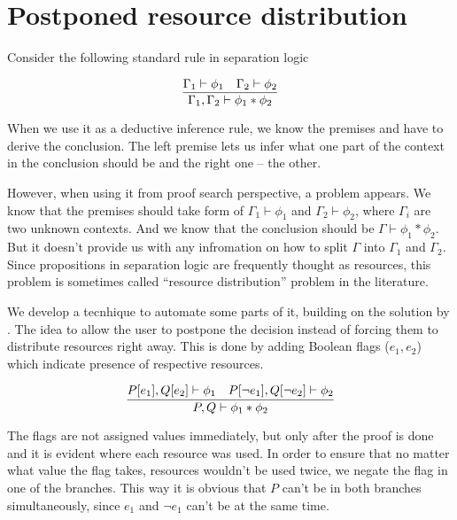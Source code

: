 \chapter{Postponed resource distribution}
\label{chap:postponed_splitting}
Consider the following standard rule in separation logic

\[\infer{\Gamma_1, \Gamma_2 \vdash \phi_1 \ast \phi_2}
        {\Gamma_1 \vdash \phi_1 &
         \Gamma_2 \vdash \phi_2} \]

When we use it as a deductive inference rule, we know the premises and have to derive the conclusion.
The left premise lets us infer what one part of the context in the conclusion should be and the right one -- the other.

However, when using it from proof search perspective, a problem appears.
We know that the premises should take form of \(\Gamma_1 \vdash \phi_1\) and \(\Gamma_2 \vdash \phi_2\), where $\Gamma_i$ are two unknown contexts.
And we know that the conclusion should be \(\Gamma \vdash \phi_1 \ast \phi_2\).
But it doesn't provide us with any infromation on how to split \(\Gamma\) into \(\Gamma_1\) and \(\Gamma_2\).
Since propositions in separation logic are frequently thought as resources, this problem is sometimes called ``resource distribution'' problem in the literature.

We develop a tecnhique to automate some parts of it, building on the solution by \citet{harlandResourceDistributionBooleanConstraints2003}.
The idea to allow the user to postpone the decision instead of forcing them to distribute resources right away.
This is done by adding Boolean flags (\(e_1, e_2\)) which indicate presence of respective resources.

\[
  \infer{P, Q \vdash \phi_1 \ast \phi_2}
        {P[e_1], Q[e_2] \vdash \phi_1 &
         P[\neg {e}_1], Q[\neg {e}_2] \vdash \phi_2}
\]

The flags are not assigned values immediately, but only after the proof is done and it is evident where each resource was used.
In order to ensure that no matter what value the flag takes, resources wouldn't be used twice, we negate the flag in one of the branches.
This way it is obvious that \(P\) can't be in both branches simultaneously, since \(e_1\) and \(\neg {e}_1\) can't be \true at the same time.

